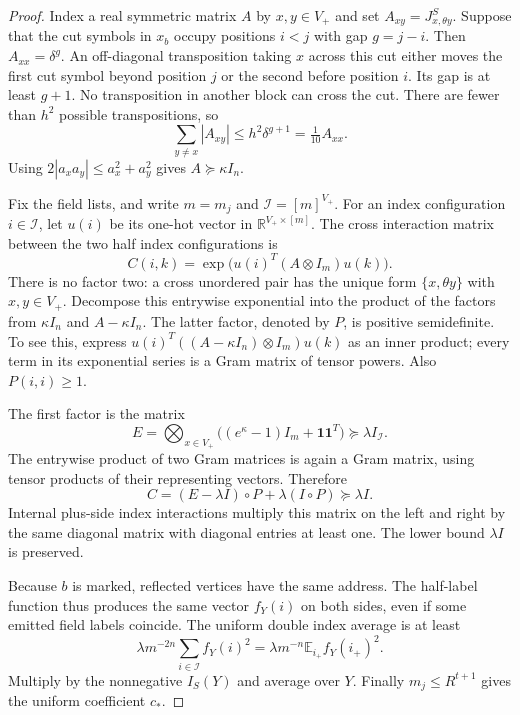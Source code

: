 \documentclass[11pt,a4paper]{article}
\numberwithin{equation}{section}
\theoremstyle{definition}
\theoremstyle{remark}
\newcommand{\E}{\mathbb E}
\newcommand{\R}{\mathbb R}
\newcommand{\one}{\mathbf 1}
\begin{document}
\begin{proof}
Index a real symmetric matrix $A$ by $x,y\in V_+$ and set
$A_{xy}=J^S_{x,\theta y}$. Suppose that the cut symbols in $x_b$
occupy positions $i<j$ with gap $g=j-i$. Then $A_{xx}=\delta^g$.
An off-diagonal transposition taking $x$ across this cut either moves
the first cut symbol beyond position $j$ or the second before position
$i$. Its gap is at least $g+1$. No transposition in another block can
cross the cut. There are fewer than $h^2$ possible transpositions, so
\[
 \sum_{y\ne x}|A_{xy}|\le h^2\delta^{g+1}
                         =\tfrac1{10}A_{xx}.
\]
Using $2|a_xa_y|\le a_x^2+a_y^2$ gives
$A\succeq\kappa I_n$.

Fix the field lists, and write $m=m_j$ and
$\mathcal I=[m]^{V_+}$. For an index configuration $i\in\mathcal I$,
let $u(i)$ be its one-hot vector in $\R^{V_+\times[m]}$. The cross
interaction matrix between the two half index configurations is
\[
 C(i,k)=\exp\bigl(u(i)^T(A\otimes I_m)u(k)\bigr).
\]
There is no factor two: a cross unordered pair has the unique form
$\{x,\theta y\}$ with $x,y\in V_+$.
Decompose this entrywise exponential into the product of the factors
from $\kappa I_n$ and $A-\kappa I_n$. The latter factor, denoted by
$P$, is positive semidefinite. To see this, express
$u(i)^T((A-\kappa I_n)\otimes I_m)u(k)$ as an inner product; every
term in its exponential series is a Gram matrix of tensor powers.
Also $P(i,i)\ge1$.

The first factor is the matrix
\[
 E=\bigotimes_{x\in V_+}
       \bigl((e^\kappa-1)I_m+\one\one^T\bigr)
       \succeq\lambda I_{\mathcal I}.
\]
The entrywise product of two Gram matrices is again a Gram matrix,
using tensor products of their representing vectors. Therefore
\[
 C=(E-\lambda I)\circ P+\lambda(I\circ P)\succeq\lambda I.
\]
Internal plus-side index interactions multiply this matrix on the
left and right by the same diagonal matrix with diagonal entries at
least one. The lower bound $\lambda I$ is preserved.

Because $b$ is marked, reflected vertices have the same address.
The half-label function thus produces the same vector $f_Y(i)$ on
both sides, even if some emitted field labels coincide. The uniform
double index average is at least
\[
 \lambda m^{-2n}\sum_{i\in\mathcal I} f_Y(i)^2
 =\lambda m^{-n}\E_{i_+}f_Y(i_+)^2.
\]
Multiply by the nonnegative $I_S(Y)$ and average over $Y$.
Finally $m_j\le R^{t+1}$ gives the uniform coefficient $c_*$.
\end{proof}
\end{document}
